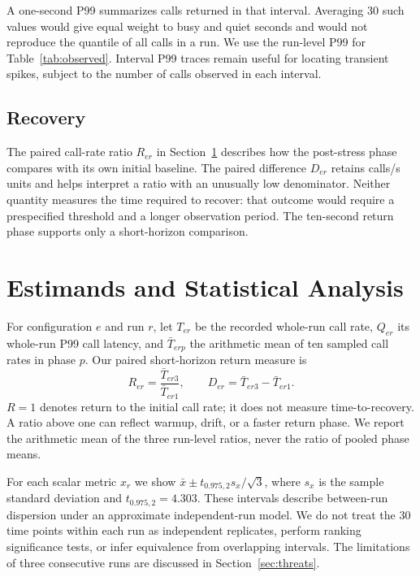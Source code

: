 \documentclass[10pt]{article}
\begin{document}
A one-second P99 summarizes calls returned in that interval. Averaging 30 such values would give equal weight to busy and quiet seconds and would not reproduce the quantile of all calls in a run. We use the run-level P99 for Table~\ref{tab:observed}. Interval P99 traces remain useful for locating transient spikes, subject to the number of calls observed in each interval.

\subsection{Recovery}
The paired call-rate ratio $R_{er}$ in Section~\ref{sec:statistics} describes how the post-stress phase compares with its own initial baseline. The paired difference $D_{er}$ retains calls/s units and helps interpret a ratio with an unusually low denominator. Neither quantity measures the time required to recover: that outcome would require a prespecified threshold and a longer observation period. The ten-second return phase supports only a short-horizon comparison.

\section{Estimands and Statistical Analysis}
\label{sec:statistics}
For configuration $e$ and run $r$, let $T_{er}$ be the recorded whole-run call rate, $Q_{er}$ its whole-run P99 call latency, and $\bar T_{erp}$ the arithmetic mean of ten sampled call rates in phase $p$. Our paired short-horizon return measure is
\begin{equation}
R_{er}=\frac{\bar T_{er3}}{\bar T_{er1}},\qquad
D_{er}=\bar T_{er3}-\bar T_{er1}.
\end{equation}
$R=1$ denotes return to the initial call rate; it does not measure time-to-recovery. A ratio above one can reflect warmup, drift, or a faster return phase. We report the arithmetic mean of the three run-level ratios, never the ratio of pooled phase means.

For each scalar metric $x_r$ we show $\bar x\pm t_{0.975,2}s_x/\sqrt{3}$, where $s_x$ is the sample standard deviation and $t_{0.975,2}=4.303$. These intervals describe between-run dispersion under an approximate independent-run model. We do not treat the 30 time points within each run as independent replicates, perform ranking significance tests, or infer equivalence from overlapping intervals. The limitations of three consecutive runs are discussed in Section~\ref{sec:threats}.
\end{document}
